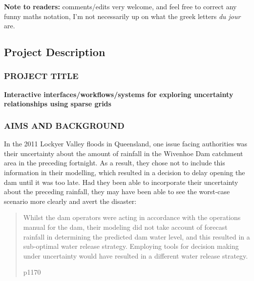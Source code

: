 \documentclass[a4paper,fontsize=12pt]{scrartcl}
\author{}
\date{\today}
\begin{document}
\noindent
\textbf{Note to readers:} comments/edits very welcome, and feel free to correct any funny maths notation, I'm not
  necessarily up on what the greek letters \emph{du jour} are.

\renewcommand{\thesection}{\Alph{section}}

\setcounter{section}{3} %
\subsection{Project Description}
\label{sec:project-description}

\subsubsection*{PROJECT TITLE}

\textbf{Interactive interfaces/workflows/systems for exploring uncertainty relationships using sparse grids}


\subsubsection*{AIMS AND BACKGROUND}


In the 2011 Lockyer Valley floods in Queensland, one issue facing
authorities was their uncertainty about the amount of rainfall in the
Wivenhoe Dam catchment area in the preceding fortnight. As a result,
they chose not to include this information in their modelling, which
resulted in a decision to delay opening the dam until it was too late.
Had they been able to incorporate their uncertainty about the
preceding rainfall, they may have been able to see the worst-case
scenario more clearly and avert the disaster:
\blockquote[\cite{vandenhonert_2011_2011} p1170]{Whilst the dam
  operators were acting in accordance with the operations manual for
  the dam, their modeling did not take account of forecast rainfall in
  determining the predicted dam water level, and this resulted in a
  sub-optimal water release strategy. Employing tools for decision
  making under uncertainty would have resulted in a different water
  release strategy.}
\end{document}
